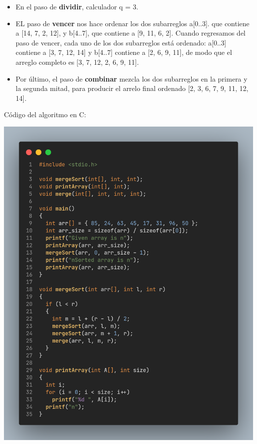 \documentclass[letterpaper, 12pt]{article}
\begin{document}
  \begin{itemize}
    \item En el paso de \textbf{dividir}, calculador q = 3.
    \item EL paso de \textbf{vencer} nos hace ordenar los dos subarreglos a[0..3]. que contiene a [14, 7, 2, 12], y
    b[4..7], que contiene a [9, 11, 6, 2]. Cuando regresamos del paso de vencer, cada uno de los dos subarreglos está
    ordenado: a[0..3] contiene a [3, 7, 12, 14] y b[4..7] contiene a [2, 6, 9, 11], de modo que el arreglo completo es
    [3, 7, 12, 2, 6, 9, 11].
    \item Por último, el paso de \textbf{combinar} mezcla los dos subarreglos en la primera y la segunda mitad, para producir
    el arrelo final ordenado [2, 3, 6, 7, 9, 11, 12, 14].
  \end{itemize}
  \newpage
  Código del algoritmo en C:
  \begin{center}
    \includegraphics[width=.9\textwidth]{src/img/mgsort_1.png}
  \end{center}
\end{document}
